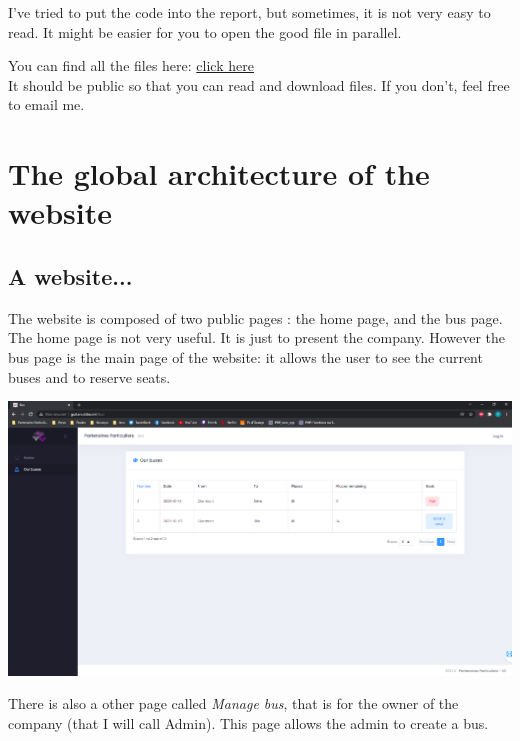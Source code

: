 \documentclass[12pt,a4paper,openany]{book}
\begin{document}
\begin{remarque}
	I've tried to put the code into the report, but sometimes, it is not very easy to read. It might be easier for you to open the good file in parallel.
\end{remarque}

\begin{remarque}
You can find all the files here: \color{blue}\href{https://github.com/kchambelin/Bus}{click here}\color{black}\\

It should be public so that you can read and download files. If you don't, feel free to email me.
\end{remarque}

\tableofcontents
\newpage

\section{The global architecture of the website}
\subsection{A website...}
The website is composed of two public pages : the home page, and the bus page. The home page is not very useful. It is just to present the company. However the bus page is the main page of the website: it allows the user to see the current buses and to reserve seats.

\begin{center}
	\includegraphics[scale=0.35]{Figs/fig1}
\end{center}

There is also a other page called \emph{Manage bus}, that is for the owner of the company (that I will call Admin). This page allows the admin to create a bus.
\end{document}
